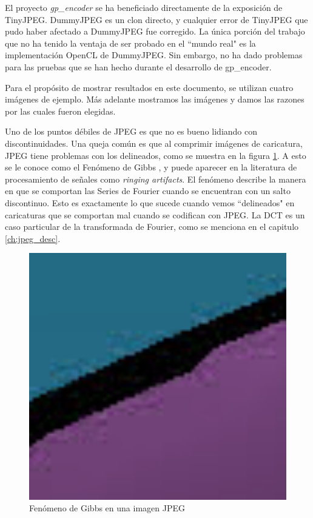 El proyecto \emph{gp\_encoder} se ha beneficiado directamente de la exposición
de TinyJPEG. DummyJPEG es un clon directo, y cualquier error de TinyJPEG que
pudo haber afectado a DummyJPEG fue corregido. La única porción del trabajo que
no ha tenido la ventaja de ser probado en el ``mundo real" es la implementación
OpenCL de DummyJPEG. Sin embargo, no ha dado problemas para las pruebas que se
han hecho durante el desarrollo de gp\_encoder.

Para el propósito de mostrar resultados en este documento, se utilizan cuatro
imágenes de ejemplo. Más adelante mostramos las imágenes y damos las razones
por las cuales fueron elegidas.

Uno de los puntos débiles de JPEG es que no es bueno lidiando con
discontinuidades. Una queja común es que al comprimir imágenes de caricatura,
JPEG tiene problemas con los delineados, como se muestra en la figura
\ref{fig:gibbs}. A esto se le conoce como el Fenómeno de Gibbs \cite{gibbs}, y
puede aparecer en la literatura de procesamiento de señales como \emph{ringing
artifacts}. El fenómeno describe la manera en que se comportan las Series de
Fourier cuando se encuentran con un salto discontinuo. Esto es exactamente lo
que sucede cuando vemos ``delineados" en caricaturas que se comportan mal
cuando se codifican con JPEG. La DCT es un caso particular de la transformada
de Fourier, como se menciona en el capitulo \ref{ch:jpeg_desc}.

\begin{figure}[b]
    \includegraphics[width=1.0\textwidth]{gibbs}
    \caption{Fenómeno de Gibbs en una imagen JPEG}
    \label{fig:gibbs}
\end{figure}

